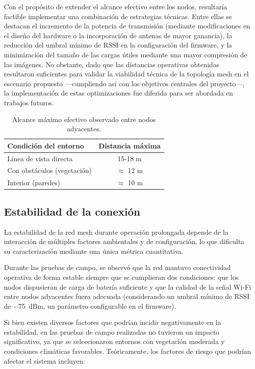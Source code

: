 \documentclass[a4paper, 12pt]{report}
\begin{document}
Con el propósito de extender el alcance efectivo entre los nodos, resultaría factible implementar una combinación de estrategias técnicas. Entre ellas se destacan el incremento de la potencia de transmisión (mediante modificaciones en el diseño del hardware o la incorporación de antenas de mayor ganancia), la reducción del umbral mínimo de RSSI en la configuración del firmware, y la minimización del tamaño de las cargas útiles mediante una mayor compresión de las imágenes. No obstante, dado que las distancias operativas obtenidas resultaron suficientes para validar la viabilidad técnica de la topología \gls{mesh} en el escenario propuesto ---cumpliendo así con los objetivos centrales del proyecto---, la implementación de estas optimizaciones fue diferida para ser abordada en trabajos futuros.

\begin{table}[htbp]
  \centering
  \caption{Alcance máximo efectivo observado entre nodos adyacentes.}
  \label{tab:distancia}
  \begin{tabular}{lc}
    \hline
    \textbf{Condición del entorno} & \textbf{Distancia máxima} \\
    \hline
    Línea de vista directa      & 15-18 \unit{m} \\
    Con obstáculos (vegetación) & $\approx$ 12 \unit{m} \\
    Interior (paredes)          & $\approx$ 10 \unit{m} \\
    \hline
  \end{tabular}
\end{table}

\subsection{Estabilidad de la conexión}

La estabilidad de la red mesh durante operación prolongada depende de la interacción de múltiples factores ambientales y de configuración, lo que dificulta su caracterización mediante una única métrica cuantitativa.

Durante las pruebas de campo, se observó que la red mantuvo conectividad operativa de forma estable siempre que se cumplieran dos condiciones: que los nodos dispusieran de carga de batería suficiente y que la calidad de la señal Wi-Fi entre nodos adyacentes fuera adecuada (considerando un umbral mínimo de RSSI de \qty{-75}{dBm}, un parámetro configurable en el firmware).

Si bien existen diversos factores que podrían incidir negativamente en la estabilidad, en las pruebas de campo realizadas no tuvieron un impacto significativo, ya que se seleccionaron entornos con vegetación moderada y condiciones climáticas favorables. Teóricamente, los factores de riesgo que podrían afectar el sistema incluyen:
\end{document}

